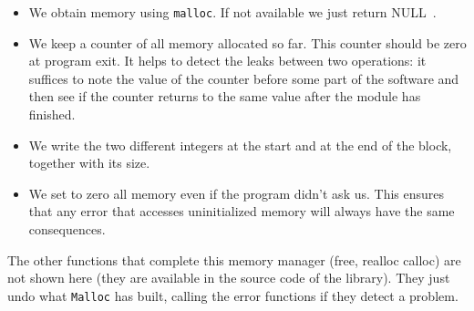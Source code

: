 \documentclass[12pt,a4paper]{memoir} %
\newif\iftth
\newcommand{\Null}{{\iftth \ NULL \else \footnotesize NULL\  \fi}}
\begin{document}
{{\begin{itemize}
\begin{enumerate}
\end{enumerate}
\item We obtain memory using \texttt{malloc}. If not available we just return \Null.
\item We keep a counter of all memory allocated so far. This counter should be zero at program exit. It helps to detect the leaks between two 
operations: it suffices to note the value of the counter before some part of the software and then see if the counter returns to the
same value after the module has finished.
\item We write the two different integers at the start and at the end of the block, together with its size.
\item We set to zero all memory even if the program didn't ask us. This ensures that any error that accesses uninitialized memory will 
always have the same consequences.
\end{itemize}
The other functions that complete this memory manager (free, realloc calloc) are not shown here (they are available in the source code 
of the library). They just undo what \texttt{Malloc} has built, calling the error functions if they detect a problem.

}}
\end{document}
